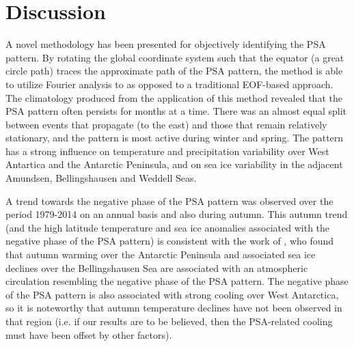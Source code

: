 \section{Discussion}

A novel methodology has been presented for objectively identifying the PSA pattern. By rotating the global coordinate system such that the equator (a great circle path) traces the approximate path of the PSA pattern, the method is able to utilize Fourier analysis to as opposed to a traditional EOF-based approach. The climatology produced from the application of this method revealed that the PSA pattern often persists for months at a time. There was an almost equal split between events that propagate (to the east) and those that remain relatively stationary, and the pattern is most active during winter and spring. The pattern has a strong influence on temperature and precipitation variability over West Antartica and the Antarctic Peninsula, and on sea ice variability in the adjacent Amundsen, Bellingshausen and Weddell Seas. 

A trend towards the negative phase of the PSA pattern was observed over the period 1979-2014 on an annual basis and also during autumn. This autumn trend (and the high latitude temperature and sea ice anomalies associated with the negative phase of the PSA pattern) is consistent with the work of \citet{Ding2013}, who found that autumn warming over the Antarctic Peninsula and associated sea ice declines over the Bellingshausen Sea are associated with an atmospheric circulation resembling the negative phase of the PSA pattern. The negative phase of the PSA pattern is also associated with strong cooling over West Antarctica, so it is noteworthy that autumn temperature declines have not been observed in that region (i.e. if our results are to be believed, then the PSA-related cooling must have been offset by other factors). 

